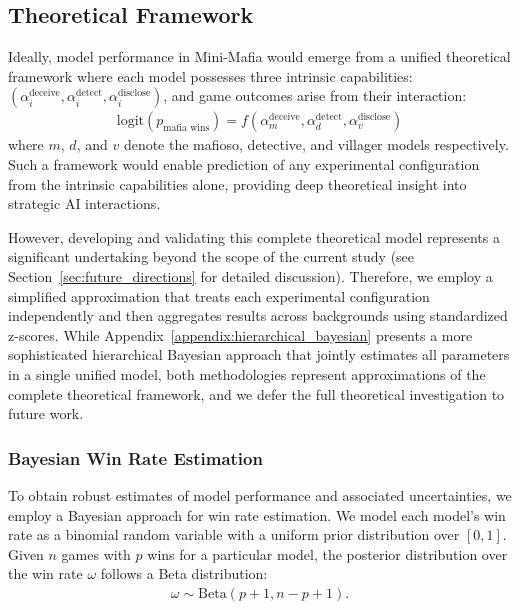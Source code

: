 \documentclass{article}
\begin{document}
\subsection{Theoretical Framework}

Ideally, model performance in Mini-Mafia would emerge from a unified theoretical framework where each model possesses three intrinsic capabilities: $(\alpha_i^{\text{deceive}}, \alpha_i^{\text{detect}}, \alpha_i^{\text{disclose}})$, and game outcomes arise from their interaction:
\begin{align}
\text{logit}(p_{\text{mafia wins}}) = f(\alpha_m^{\text{deceive}}, \alpha_d^{\text{detect}}, \alpha_v^{\text{disclose}})
\end{align}
where $m$, $d$, and $v$ denote the mafioso, detective, and villager models respectively. Such a framework would enable prediction of any experimental configuration from the intrinsic capabilities alone, providing deep theoretical insight into strategic AI interactions.

However, developing and validating this complete theoretical model represents a significant undertaking beyond the scope of the current study (see Section~\ref{sec:future_directions} for detailed discussion). Therefore, we employ a simplified approximation that treats each experimental configuration independently and then aggregates results across backgrounds using standardized z-scores. While Appendix~\ref{appendix:hierarchical_bayesian} presents a more sophisticated hierarchical Bayesian approach that jointly estimates all parameters in a single unified model, both methodologies represent approximations of the complete theoretical framework, and we defer the full theoretical investigation to future work. 


\subsubsection{Bayesian Win Rate Estimation}

To obtain robust estimates of model performance and associated uncertainties, we employ a Bayesian approach for win rate estimation. We model each model's win rate as a binomial random variable with a uniform prior distribution over $[0,1]$. Given $n$ games with $p$ wins for a particular model, the posterior distribution over the win rate $\omega$ follows a Beta distribution:
\begin{align}
\omega\sim \text{Beta}(p + 1, n - p + 1).
\end{align}
\end{document}
